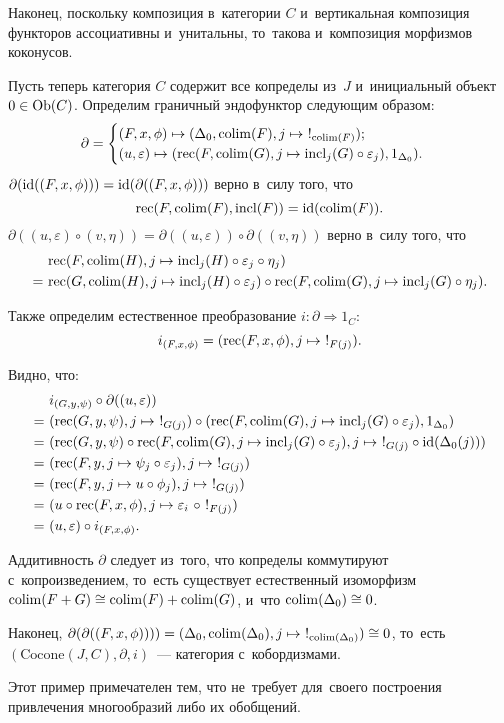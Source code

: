 \documentclass[a4paper,oneside]{article}
\begin{document}
\begin{example}
Наконец, поскольку композиция в~категории $C$ и~вертикальная композиция функторов ассоциативны
и~унитальны, то~такова и~композиция морфизмов коконусов.

Пусть теперь категория $C$ содержит все копределы из~$J$ и~инициальный объект $0 \in \mathrm{Ob}(C)$.
Определим граничный эндофунктор следующим образом:
\[
\partial = \begin{cases}
             (F, x, \phi) \mapsto (\Delta_0, \colim(F), j \mapsto\ !_{\colim(F)}); \\
             (u, \varepsilon) \mapsto (\rec(F, \colim(G), j \mapsto \incl_j(G) \circ \varepsilon_j), 1_{\Delta_0}).
           \end{cases}
\]
$\partial(\mathrm{id}((F, x, \phi))) = \mathrm{id}(\partial((F, x, \phi)))$ верно в~силу того, что
\[
  \mathrm{rec}(F, \mathrm{colim}(F), \mathrm{incl}(F)) = \mathrm{id}(\mathrm{colim}(F)).
\]
$\partial((u, \varepsilon) \circ (v, \eta)) = \partial((u, \varepsilon)) \circ \partial((v, \eta))$
верно в~силу того, что
\[
\begin{aligned}
  \phantom{=}&\ \mathrm{rec}(F, \mathrm{colim}(H), j \mapsto \mathrm{incl}_j(H) \circ \varepsilon_j \circ \eta_j) \\
            =&\ \mathrm{rec}(G, \mathrm{colim}(H), j \mapsto \mathrm{incl}_j(H) \circ \varepsilon_j) \circ \mathrm{rec}(F, \mathrm{colim}(G), j \mapsto \mathrm{incl}_j(G) \circ \eta_j).
\end{aligned}
\]

Также определим естественное преобразование $i : \partial \Rightarrow 1_C$:
\[
  i_{(F, x, \phi)} = (\mathrm{rec}(F, x, \phi), j \mapsto\ !_{F(j)}).
\]

Видно, что:
\[
\begin{aligned}
  \phantom{=}&\ i_{(G, y, \psi)} \circ \partial((u, \varepsilon)) \\
            =&\ (\rec(G, y, \psi), j \mapsto\ !_{G(j)}) \circ (\rec(F, \colim(G), j \mapsto \incl_j(G) \circ \varepsilon_j), 1_{\Delta_0}) \\
            =&\ (\rec(G, y, \psi) \circ \rec(F, \colim(G), j \mapsto \incl_j(G) \circ \varepsilon_j), j \mapsto\ !_{G(j)} \circ \id(\Delta_0(j))) \\
            =&\ (\rec(F, y, j \mapsto \psi_j \circ \varepsilon_j), j \mapsto\ !_{G(j)}) \\
            =&\ (\rec(F, y, j \mapsto u \circ \phi_j), j \mapsto\ !_{G(j)}) \\
            =&\ (u \circ \rec(F, x, \phi), j \mapsto \varepsilon_i\ \circ\ !_{F(j)}) \\
            =&\ (u, \varepsilon) \circ i_{(F, x, \phi)}.
\end{aligned}
\]

Аддитивность $\partial$ следует из~того, что копределы коммутируют с~копроизведением,
то~есть существует естественный изоморфизм $\mathrm{colim}(F + G) \cong \mathrm{colim}(F) + \mathrm{colim}(G)$,
и~что $\mathrm{colim}(\Delta_0) \cong 0$.

Наконец, $\partial(\partial((F, x, \phi)))) = (\Delta_0, \mathrm{colim}(\Delta_0), j \mapsto\ !_{\mathrm{colim}(\Delta_0)}) \cong 0$,
то~есть $(\mathrm{Cocone}(J, C), \partial, i)$~— категория с~кобордизмами.

Этот пример примечателен тем, что не~требует для~своего построения привлечения многообразий либо их обобщений.
\end{example}
\end{document}
